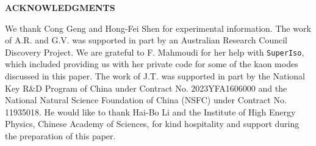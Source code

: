 \documentclass[amsmath,amssymb,aps,nofootinbib,prd,preprint,superscriptaddress,tightenlines,a4paper,bm]{revtex4-2}
\begin{document}
{\bf\small ACKNOWLEDGMENTS} \medskip

We thank Cong Geng and Hong-Fei Shen for experimental information.
The work of A.R. and G.V. was supported in part by an Australian Research Council Discovery Project.
We are grateful to F. Mahmoudi for her help with {\tt SuperIso}, which included providing us with her private code for some of the kaon modes discussed in this paper.
The work of J.T. was supported in part by the National Key R\&D Program of China under Contract No. 2023YFA1606000 and the National Natural Science Foundation of China (NSFC) under Contract No. 11935018.
He would like to thank Hai-Bo Li and the Institute of High Energy Physics, Chinese Academy of Sciences, for kind hospitality and support during the preparation of this paper.

\newpage


\end{document}
